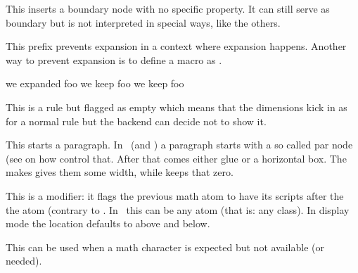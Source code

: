 \startnewprimitive[title={\prm {noboundary}}]

This inserts a boundary node with no specific property. It can still serve as
boundary but is not interpreted in special ways, like the others.

\stopnewprimitive

\startoldprimitive[title={\prm {noexpand}}]

This prefix prevents expansion in a context where expansion happens. Another way
to prevent expansion is to define a macro as .

\startbuffer
          \def\foo{foo} \edef\oof{we expanded      \foo} \meaning\oof
          \def\foo{foo} \edef\oof{we keep \noexpand\foo} \meaning\oof
\protected\def\foo{foo} \edef\oof{we keep          \foo} \meaning\oof
\stopbuffer

\typebuffer

\startlines
\getbuffer
\stoplines

\stopoldprimitive

\startnewprimitive[title={\prm {nohrule}}]

This is a rule but flagged as empty which means that the dimensions kick in as
for a normal rule but the backend can decide not to show it.

\stopnewprimitive

\startoldprimitive[title={\prm {noindent}}]

This starts a paragraph. In \LUATEX\ (and \LUAMETATEX) a paragraph starts with a
so called par node (see  on how control that. After that comes
either  glue or a horizontal box. The  makes gives
them some width, while  keeps that zero.

\stopoldprimitive

\startoldprimitive[title={\prm {nolimits}}]

This is a modifier: it flags the previous math atom to have its scripts after the
the atom (contrary to . In \LUAMETATEX\ this can be any atom (that
is: any class). In display mode the location defaults to above and below.

\stopoldprimitive

\startnewprimitive[title={\prm {nomathchar}}]

This can be used when a math character is expected but not available (or needed).

\stopnewprimitive

\startoldprimitive[title={\prm {nonscript}}]

